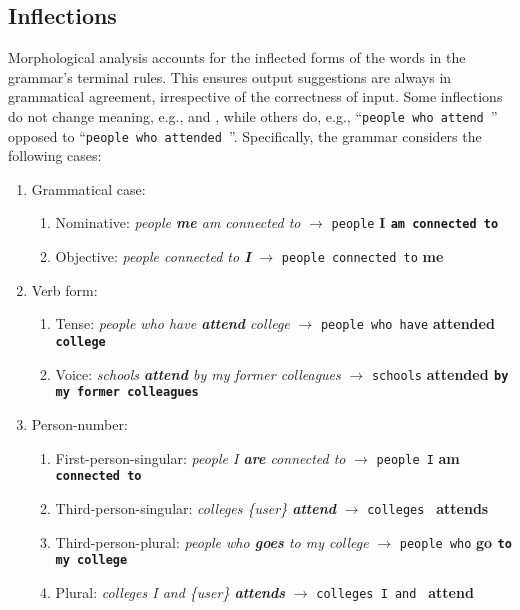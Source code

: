 \documentclass{article}
\begin{document}
\subsection{Inflections}
Morphological analysis accounts for the inflected forms of the words in the grammar's terminal rules. This ensures output suggestions are always in grammatical agreement, irrespective of the correctness of input. Some inflections do not change meaning, e.g.,  and , while others do, e.g., ``\texttt{people who attend }'' opposed to ``\texttt{people who attended }''. Specifically, the grammar considers the following cases:
\begin{enumerate}
\item Grammatical case:
\begin{enumerate}
\item Nominative: \textit{people \textbf{me} am connected to} $\rightarrow$    \texttt{people} \bfseries I \mdseries \texttt{am connected to}
\item Objective: \textit{people connected to \textbf{I}} $\rightarrow$ \texttt{people connected to} \bfseries me \mdseries
\end{enumerate}
\item Verb form:
\begin{enumerate}
\item Tense: \textit{people who have \textbf{attend} college} $\rightarrow$ \texttt{people who have} \bfseries attended \mdseries \texttt{college}
\item Voice: \textit{schools \textbf{attend} by my former colleagues} $\rightarrow$ \texttt{schools} \bfseries attended \mdseries \texttt{by my former colleagues}
\end{enumerate}
\item Person-number:
\begin{enumerate}
\item First-person-singular: \textit{people I \textbf{are} connected to} $\rightarrow$ \texttt{people I} \bfseries am \mdseries \texttt{connected to}
\item Third-person-singular: \textit{colleges \{user\} \textbf{attend}} $\rightarrow$ \texttt{colleges } \bfseries attends \mdseries
\item Third-person-plural: \textit{people who \textbf{goes} to my college} $\rightarrow$ \texttt{people who} \bfseries go \mdseries \texttt{to my college}
\item Plural: \textit{colleges I and \{user\} \textbf{attends}} $\rightarrow$ \texttt{colleges I and } \bfseries attend \mdseries
\end{enumerate}
\end{enumerate}
\end{document}
